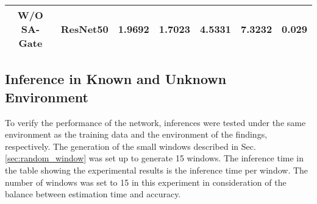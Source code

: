 \begin{table*}[!t]
\begin{tabular}{|cl|rr|rr|r|}
\multicolumn{1}{|c|}{W/O SA-Gate}                                                                    & ResNet50                   & \multicolumn{1}{r|}{1.9692}                                                                                  & 1.7023                                                                                                        & \multicolumn{1}{r|}{4.5331}                                                                                  & 7.3232                                                                                                        & 0.029                                                                                                                           \\ \hline
\end{tabular}
\end{table*}
\subsection{Inference in Known and Unknown Environment}\label{sec:result}
To verify the performance of the network, inferences were tested under the same environment as the training data and the environment of the findings, respectively. The generation of the small windows described in Sec.\ref{sec:random_window} was set up to generate 15 windows. The inference time in the table showing the experimental results is the inference time per window. The number of windows was set to 15 in this experiment in consideration of the balance between estimation time and accuracy.



